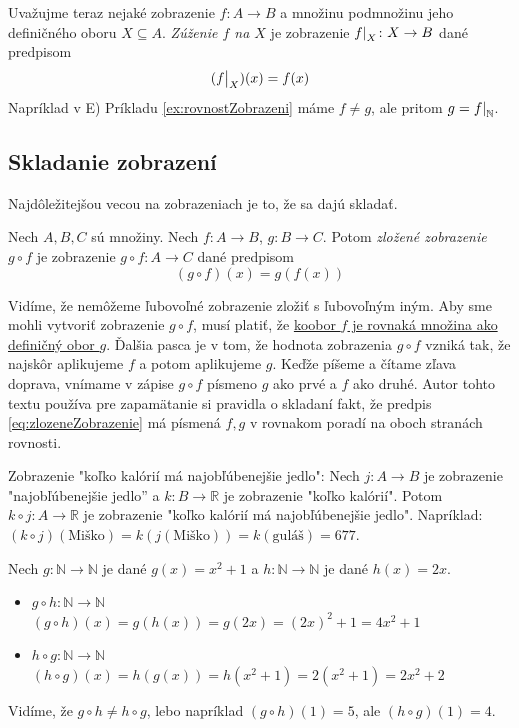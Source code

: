 Uvažujme teraz nejaké zobrazenie $f\colon A\to B$ a množinu podmnožinu jeho 
definičného oboru $X\subseteq A$.
\emph{Zúženie $f$ na $X$} je zobrazenie $\restr{f}{X}\colon X\to B$ dané
predpisom
\[
(\restr{f}{X})(x)=f(x)
\]
Napríklad v E) Príkladu \ref{ex:rovnostZobrazeni} máme $f\neq g$, ale pritom
$g=\restr{f}{\Nat}$.

\subsection{Skladanie zobrazení}

Najdôležitejšou vecou na zobrazeniach je to, že sa dajú skladať.

\begin{definition}
Nech $A, B, C$ sú množiny. Nech $f \colon A \rightarrow B$, $g \colon B \rightarrow C$.
Potom \emph{zložené zobrazenie} $g \circ f$ je zobrazenie $g \circ f \colon A \rightarrow C$ dané predpisom
\begin{equation}\label{eq:zlozeneZobrazenie}
(g \circ f)(x) = g(f(x))
\end{equation}
\end{definition}

Vidíme, že nemôžeme ľubovoľné zobrazenie zložiť s ľubovoľným iným. Aby sme mohli vytvoriť zobrazenie $g\circ f$, musí
platiť, že \ul{koobor $f$ je rovnaká množina ako definičný obor $g$}. Ďalšia pasca je v tom, že hodnota
zobrazenia $g\circ f$ vzniká tak, že najskôr aplikujeme $f$ a potom aplikujeme $g$. Keďže píšeme a čítame zľava doprava,
vnímame v zápise $g\circ f$ písmeno $g$ ako prvé a $f$ ako druhé. Autor tohto textu používa pre zapamätanie si pravidla
o skladaní fakt, že predpis \eqref{eq:zlozeneZobrazenie} má písmená $f,g$ v rovnakom poradí na oboch stranách rovnosti.

\begin{example}
Zobrazenie "koľko kalórií má najobľúbenejšie jedlo":
Nech $j \colon A \rightarrow B$ je zobrazenie "najobľúbenejšie jedlo'' {a} $k \colon B \rightarrow \mathbb{R}$ je zobrazenie "koľko kalórií".
Potom $k \circ j \colon A \rightarrow \mathbb{R}$ je zobrazenie "koľko kalórií má najobľúbenejšie jedlo".
Napríklad: $(k \circ j)(\text{Miško}) = k(j(\text{Miško})) = k(\text{guláš}) = 677$.
\end{example}

\begin{example}
Nech $g \colon \mathbb{N} \rightarrow \mathbb{N}$ je dané $g(x) = x^2+1$ a $h \colon \mathbb{N} \rightarrow \mathbb{N}$ je dané $h(x) = 2x$.
\begin{itemize}
    \item $g \circ h \colon \mathbb{N} \rightarrow \mathbb{N}$ \\
    $(g \circ h)(x) = g(h(x)) = g(2x) = (2x)^2+1 = 4x^2+1$
    \item $h \circ g \colon \mathbb{N} \rightarrow \mathbb{N}$ \\
    $(h \circ g)(x) = h(g(x)) = h(x^2+1) = 2(x^2+1) = 2x^2+2$
\end{itemize}
Vidíme, že $g \circ h \neq h \circ g$, lebo napríklad $(g \circ h)(1) = 5$, ale $(h \circ g)(1) = 4$.
\end{example}

